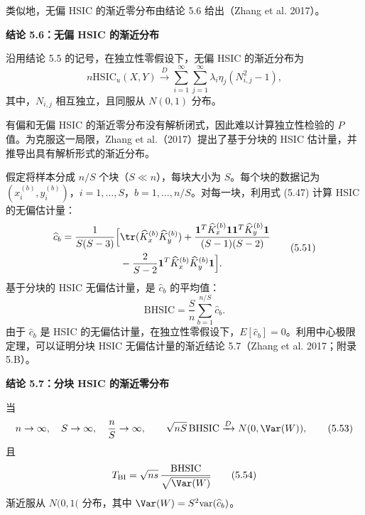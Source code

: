 类似地，无偏 HSIC 的渐近零分布由结论 5.6 给出（Zhang et al. 2017）。

\par\medskip{}
\noindent\textbf{结论 5.6：无偏 HSIC 的渐近分布}\par
沿用结论 5.5 的记号，在独立性零假设下，无偏 HSIC 的渐近分布为
\begin{equation}
n\mathrm{HSIC}_u(X,Y)\xrightarrow{D}
\sum_{i=1}^\infty\sum_{j=1}^\infty\lambda_i\eta_j(N_{i,j}^2-1),
\tag{5.50}
\end{equation}
其中，$N_{i,j}$ 相互独立，且同服从 $N(0,1)$ 分布。


有偏和无偏 HSIC 的渐近零分布没有解析闭式，因此难以计算独立性检验的 $P$ 值。为克服这一局限，Zhang et al.（2017）提出了基于分块的 HSIC 估计量，并推导出具有解析形式的渐近分布。

假定将样本分成 $n/S$ 个块（$S\ll n$），每块大小为 $S$。每个块的数据记为 $(x_i^{(b)},y_i^{(b)})$，$i=1,\ldots,S$，$b=1,\ldots,n/S$。对每一块，利用式 (5.47) 计算 HSIC 的无偏估计量：
\begin{equation}
\begin{aligned}
\widehat c_b=\frac1{S(S-3)}\Bigl[{}&\tr(\widehat K_x^{(b)}\widehat K_y^{(b)})
+\frac{\mathbf1^T\widehat K_x^{(b)}\mathbf1\mathbf1^T\widehat K_y^{(b)}\mathbf1}{(S-1)(S-2)}\\
&-\frac2{S-2}\mathbf1^T\widehat K_x^{(b)}\widehat K_y^{(b)}\mathbf1\Bigr].
\end{aligned}
\tag{5.51}
\end{equation}
基于分块的 HSIC 无偏估计量，是 $\widehat c_b$ 的平均值：
\begin{equation}
\mathrm{BHSIC}=\frac Sn\sum_{b=1}^{n/S}\widehat c_b.
\tag{5.52}
\end{equation}
由于 $\widehat c_b$ 是 HSIC 的无偏估计量，在独立性零假设下，$E[\widehat c_b]=0$。利用中心极限定理，可以证明分块 HSIC 无偏估计量的渐近结论 5.7（Zhang et al. 2017；附录 5.B）。

\par\medskip{}
\noindent\textbf{结论 5.7：分块 HSIC 的渐近零分布}\par
当
\begin{equation}
n\to\infty,\quad S\to\infty,\quad\frac nS\to\infty,\qquad
\sqrt{nS}\,\mathrm{BHSIC}\xrightarrow{D}N(0,\Var(W)),
\tag{5.53}
\end{equation}
且
\begin{equation}
T_{\mathrm{BI}}=\sqrt{ns}\,\frac{\mathrm{BHSIC}}{\sqrt{\Var(W)}}
\tag{5.54}
\end{equation}
渐近服从 $N(0,1($ 分布，其中 $\Var(W)=S^2\mathrm{var}(\widehat c_b)$。

